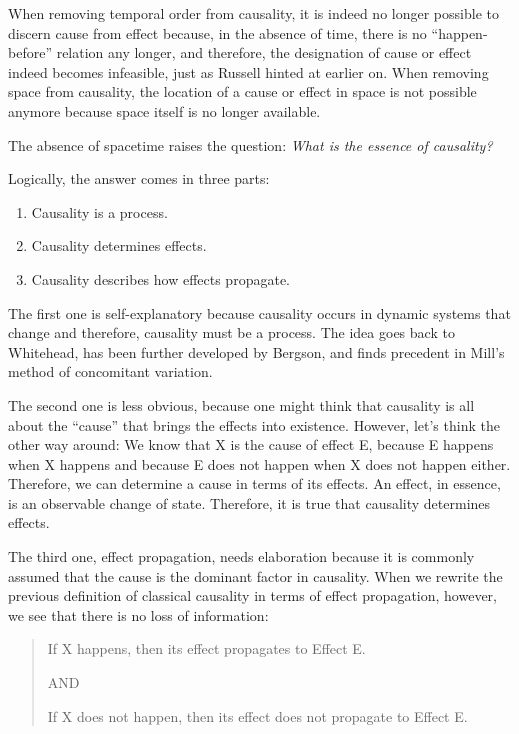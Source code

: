 When removing temporal order from causality, it is indeed no longer possible to discern cause from effect because, in the absence of time, there is no “happen-before” relation any longer, and therefore, the designation of cause or effect indeed becomes infeasible, just as Russell hinted at earlier on. When removing space from causality, the location of a cause or effect in space is not possible anymore because space itself is no longer available. 

\newpage

The absence of spacetime raises the question: \textit{What is the essence of causality?}

Logically, the answer comes in three parts:

\begin{enumerate}
    \item Causality is a process.
    \item Causality determines effects.
    \item Causality describes how effects propagate.
\end{enumerate}


The first one is self-explanatory because causality occurs in dynamic systems that change and therefore, causality must be a process. The idea goes back to Whitehead, has been further developed by Bergson, and finds precedent in Mill's method of concomitant variation\cite{mill2023system}.  

The second one is less obvious, because one might think that causality is all about the “cause” that brings the effects into existence. However, let’s think the other way around: We know that X is the cause of effect E, because E happens when X happens and because E does not happen when X does not happen either. Therefore, we can determine a cause in terms of its effects. An effect, in essence, is an observable change of state. Therefore, it is true that causality determines effects.

The third one, effect propagation, needs elaboration because it is commonly assumed that the cause is the dominant factor in causality. When we rewrite the previous definition of classical causality in terms of effect propagation, however, we see that there is no loss of information:

\begin{quote}
    If X happens, then its effect propagates to Effect E.

    AND
    
    If X does not happen, then its effect does not propagate to Effect E.
\end{quote}

